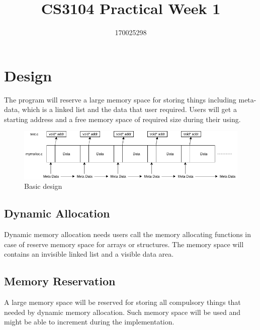 \documentclass[legalpaper]{article}
\title{\vspace{-4cm}CS3104 Practical Week 1}
\author{170025298}
\date{}
\begin{document}
	\maketitle
	\section{Design}
	The program will reserve a large memory space for storing things including meta-data, which is a linked list and the data that user required. Users will get a starting address and a free memory space of required size during their using.
	\begin{figure}[h!]
	\centering
	\includegraphics[width = \textwidth]{P1}
	\caption{Basic design}
	\end{figure}
	\subsection{Dynamic Allocation}
	Dynamic memory allocation needs users call the memory allocating functions in case of reserve memory space for arrays or structures. The memory space will contains an invisible linked list and a visible data area.
	\subsection{Memory Reservation}
	A large memory space will be reserved for storing all compulsory things that needed by dynamic memory allocation. Such memory space will be used and might be able to increment during the implementation.
\end{document}
